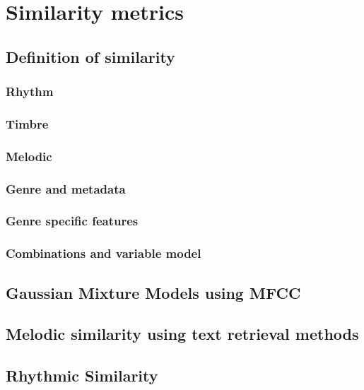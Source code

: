 
\chapter{Similarity metrics}\label{simmet}

\section{Definition of similarity}

\subsection{Rhythm}

\subsection{Timbre}

\subsection{Melodic}

\subsection{Genre and metadata}

\subsection{Genre specific features}

\subsection{Combinations and variable model}

\section{Gaussian Mixture Models using MFCC}

\section{Melodic similarity using text retrieval methods}

\section{Rhythmic Similarity}

